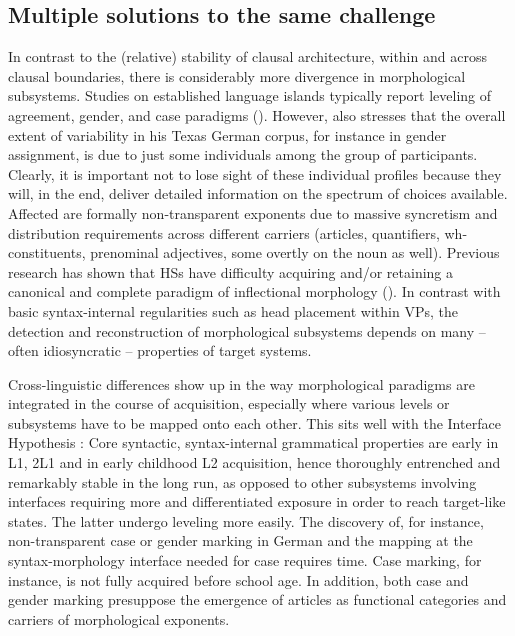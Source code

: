 \documentclass[output=paper]{langscibook}
\begin{document}
\subsection{Multiple solutions to the same challenge}\label{sec:tsehaye:5.4}
\begin{sloppypar}
In contrast to the (relative) stability of clausal architecture, within and across clausal boundaries, there is considerably more divergence in morphological subsystems. Studies on established language islands typically report leveling of agreement, gender, and case paradigms (\citealt{Boas2009b, Boas2009a, Clyne2003, YagerEtAl2015, Zimmer2020}). However, \citet{Boas2009b} also stresses that the overall extent of variability in his Texas German corpus, for instance in gender assignment, is due to just some individuals among the group of participants. Clearly, it is important not to lose sight of these individual profiles because they will, in the end, deliver detailed information on the spectrum of choices available. Affected are formally non-transparent exponents due to massive syncretism and distribution requirements across different carriers (articles, quantifiers, wh-constituents, prenominal adjectives, some overtly on the noun as well). Previous research has shown that HSs have difficulty acquiring and/or retaining a canonical and complete paradigm of inflectional morphology (\citealt{Flores2020, Montrul2011, Polinsky2018Bilingual, Polinsky2018Heritage}). In contrast with basic syntax-internal regularities such as head placement within VPs, the detection and reconstruction of morphological subsystems depends on many – often idiosyncratic – properties of target systems.
\end{sloppypar}

Cross-linguistic differences show up in the way morphological paradigms are integrated in the course of acquisition, especially where various levels or subsystems have to be mapped onto each other. This sits well with the Interface Hypothesis \citep{Tsimpli2014}: Core syntactic, syntax-internal grammatical properties are early in L1, 2L1 and in early childhood L2 acquisition, hence thoroughly entrenched and remarkably stable in the long run, as opposed to other subsystems involving interfaces requiring more and differentiated exposure in order to reach target-like states. The latter undergo leveling more easily. The discovery of, for instance, non-transparent case or gender marking in German and the mapping at the syntax-morphology interface needed for case requires time. Case marking, for instance, is not fully acquired before school age. In addition, both case and gender marking presuppose the emergence of articles as functional categories and carriers of morphological exponents.
\end{document}
